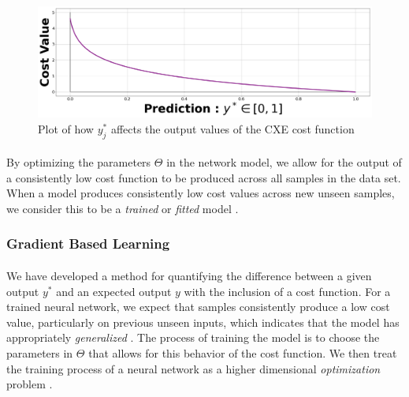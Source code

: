 \documentclass[12pt,letterpaper]{article}
\begin{document}
\begin{figure}[h]
\begin{center}
\includegraphics[scale=0.25]{../Figures/CXELoss}
\end{center}
\caption{Plot of how $y^*_{j}$ affects the output values of the CXE cost function}
\label{fig-CXELoss}
\end{figure}

\paragraph*{}By optimizing the parameters $\Theta$ in the network model, we allow for the output of a consistently low cost function to be produced across all samples in the data set. When a model produces consistently low cost values across new unseen samples, we consider this to be a \textit{trained} or \textit{fitted} model \cite{Goodfellow,Loy,Mitchell}.


\subsubsection{Gradient Based Learning}

\paragraph*{}We have developed a method for quantifying the difference between a given output $y^*$ and an expected output $y$ with the inclusion of a cost function. For a trained neural network, we expect that samples consistently produce a low cost value, particularly on previous unseen inputs, which indicates that the model has appropriately \textit{generalized} \cite{James,Loy}. The process of training the model is to choose the parameters in $\Theta$ that allows for this behavior of the cost function. We then treat the training process of a neural network as a higher dimensional \textit{optimization} problem \cite{Goodfellow}.
\end{document}
